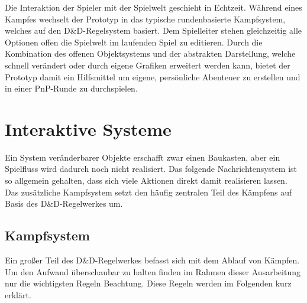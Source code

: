 Die Interaktion der Spieler mit der Spielwelt geschieht in Echtzeit. Während eines Kampfes wechselt der Prototyp in das typische rundenbasierte Kampfsystem, welches auf den D\&D-Regelsystem basiert. Dem Spielleiter stehen gleichzeitig alle Optionen offen die Spielwelt im laufenden Spiel zu editieren.\newline
Durch die Kombination des offenen Objektsystems und der abstrakten Darstellung, welche schnell verändert oder durch eigene Grafiken erweitert werden kann, bietet der Prototyp damit ein Hilfsmittel um eigene, persönliche Abenteuer zu erstellen und in einer PnP-Runde zu durchspielen.


\section{Interaktive Systeme}
\label{sec:InteraktiveSysteme}
Ein System veränderbarer Objekte erschafft zwar einen Baukasten, aber ein Spielfluss wird dadurch noch nicht realisiert. Das folgende Nachrichtensystem ist so allgemein gehalten, dass sich viele Aktionen direkt damit realisieren lassen. Das zusätzliche Kampfsystem setzt den häufig zentralen Teil des Kämpfens auf Basis des D\&D-Regelwerkes um.

\subsection{Kampfsystem}
\label{sec:Kampfsystem}
Ein großer Teil des D\&D-Regelwerkes befasst sich mit dem Ablauf von Kämpfen. Um den Aufwand überschaubar zu halten finden im Rahmen dieser Ausarbeitung nur die wichtigsten Regeln Beachtung. Diese Regeln werden im Folgenden kurz erklärt. 

